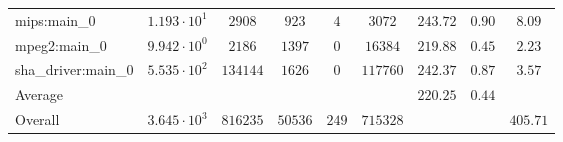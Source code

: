 \begin{tabular}{|l|c|c|c|c|c|c|c|c|}
mips:main\_0            & $ 1.193 \cdot 10^{1}  $ & $ 2908   $ & $ 923   $ & $ 4   $ & $ 3072   $ & $ 243.72      $ & $ 0.90    $ & $ 8.09    $ \\
mpeg2:main\_0           & $ 9.942 \cdot 10^{0}  $ & $ 2186   $ & $ 1397  $ & $ 0   $ & $ 16384  $ & $ 219.88      $ & $ 0.45    $ & $ 2.23    $ \\
sha\_driver:main\_0     & $ 5.535 \cdot 10^{2}  $ & $ 134144 $ & $ 1626  $ & $ 0   $ & $ 117760 $ & $ 242.37      $ & $ 0.87    $ & $ 3.57    $ \\
\hline
Average                 & $                     $ & $        $ & $       $ & $     $ & $        $ & $ 220.25      $ & $ 0.44    $ & $         $ \\
\hline
Overall                 & $ 3.645 \cdot 10^{3}  $ & $ 816235 $ & $ 50536 $ & $ 249 $ & $ 715328 $ & $             $ & $         $ & $ 405.71  $ \\
\hline
\end{tabular}
